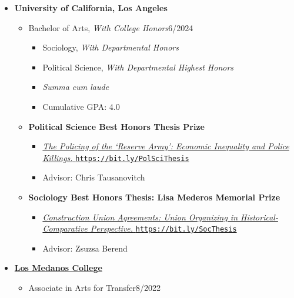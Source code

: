 \begin{itemize}[leftmargin=0em, itemsep=0pt]
\item[] \textbf{University of California, Los Angeles}
\begin{itemize}[leftmargin=2em, itemsep=0pt]
    \item[] Bachelor of Arts, \textit{With College Honors}\hfill{}6/2024
    \begin{itemize}[leftmargin=2em, itemsep=0pt]
        \item[] Sociology, \textit{With Departmental Honors}
        \item[] Political Science, \textit{With Departmental Highest Honors}
    \item[] \textit{Summa cum laude}
    \item[] Cumulative GPA: 4.0
    \end{itemize}
    \vspace{6pt}
\item[] \textbf{Political Science Best Honors Thesis Prize}
\begin{itemize}[leftmargin=2em, itemsep=0pt, rightmargin=5em]
    \item[] \href{https://bit.ly/PolSciThesis}{\textit{The Policing of the `Reserve Army': Economic Inequality and Police Killings.} \texttt{https://bit.ly/PolSciThesis}}
    \item[] Advisor: Chris Tausanovitch
\end{itemize}
\vspace{6pt}
\item[] \textbf{Sociology Best Honors Thesis: Lisa Mederos Memorial Prize}
\begin{itemize}[leftmargin=2em, itemsep=0pt, rightmargin=5em]
    \item[] \href{https://bit.ly/SocThesis}{\textit{Construction Union Agreements: Union Organizing in Historical-Comparative Perspective.} \texttt{https://bit.ly/SocThesis}}
    \item[] Advisor: Zsuzsa Berend
    \end{itemize}
\end{itemize}
\vspace{12pt}
\item[] \textbf{\href{https://www.losmedanos.edu/}{Los Medanos College}}
\begin{itemize}[leftmargin=2em, itemsep=0pt]
    \item[] Associate in Arts for Transfer\hfill{}8/2022

\end{itemize}
\end{itemize}
